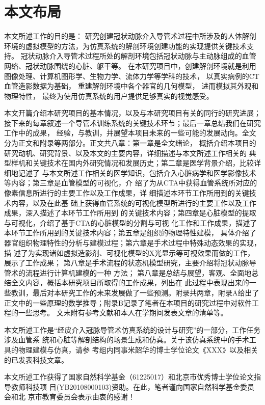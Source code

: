 \section{本文布局}
\label{sec1-5}

本文所述工作的目的是：
研究创建冠状动脉介入导管术过程中所涉及的人体解剖环境的虚拟模型的方法，为仿真系统的解剖环境创建功能的实现提供关键技术支持。
冠状动脉介入导管术过程所处的解剖环境包括冠状动脉与主动脉组成的血管网络、冠状动脉围绕的心脏、躯干等。
在本研究项目中，创建解剖环境就是利用图像处理、计算机图形学、生物力学、流体力学等学科的技术，
以真实病例的CT血管造影数据为基础，
重建解剖环境中各个器官的几何模型，
进而模拟其外观和物理特性，
最终为使用仿真系统的用户提供足够真实的视觉感受。

本文开篇介绍本研究项目的基本情况，以及与本研究项目有关的同行的研究进展；
接下来的每章叙述一个导管术训练系统的关键技术环节；最后一章总结我们在研究工作中的成果，
经验，与教训，并展望本项目未来的一些可能的发展动向。全文分为正文和附录等两部分。正文共八章：第一章是全文绪论，
概括介绍本项目的研究动机、研究背景、以及本文的主要内容，详细描述与本文所述工作相关的
典型样机和关键技术在国内外研究情况和发展历史；第二章是医学背景介绍，比较详细地记述了
与本文所述工作相关的医学知识，包括介入心脏病学和医学影像技术等内容；第三章是血管模型的可视化，介
绍了为从CTA中获得血管系统所对应的像素信息所进行的主要工作以及工作成果，详
细描述本环节工作所用到的关键技术内容，以及在此基
础上获得血管系统的可视化模型所进行的主要工作以及工作成果，深入描述了本环节工作所用到
的关键技术内容；第四章是心脏模型的提取与可视化，介绍了基于CTA的心脏模型的分割与可视
化工作和工作成果，描述了本环节工作所用到的关键技术内容；第五章是组织的物理特性建模，
具体介绍了器官组织物理特性的分析与建模过程；第六章是手术过程中特殊动态效果的实现，描
述了为实现诸如虚拟造影剂、可视化模型的X光显示等可视效果而做的工作，展示了工作成果；
第八章是手术流程的状态机模型研究，主要介绍将冠状动脉导管术的流程进行计算机建模的一种
方法；
第八章是总结与展望，客观、全面地总结全文内容，概括本研究项目所取得的工作成果，列出在
此过程中表现出来的一些教训，最后对本研究工作的未来发展做了一些预测。附录共两章，附录A给出了正文中的一些原理的数学推导；附录B记录了笔者在本项目的研究过程中对软件工程的一些思考。
文末附有参考文献和本人在学期间发表文章的清单等。

本文所述工作是“经皮介入冠脉导管术仿真系统的设计与研究”的一部分，工作任务涉及血管系
统和心脏等解剖结构的场景生成和仿真。关于该仿真系统中的手术工具的物理建模与仿真，请参
考组内同事米韶华的博士学位论文《XXX》以及相关的已发表科技文章。

本文所述工作获得了国家自然科学基金（61225017）和北京市优秀博士学位论文指导教师科技项
目(YB20108000103)资助。在此，笔者谨向国家自然科学基金委员会和北
京市教育委员会表示由衷的感谢！ 